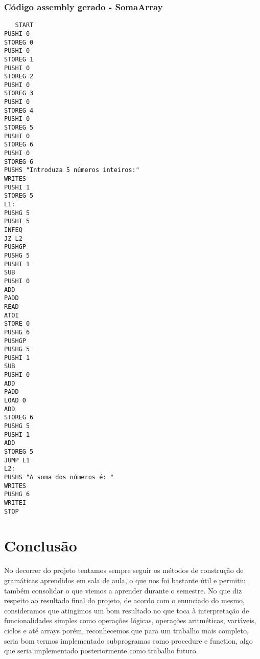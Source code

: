 \documentclass[12pt,a4paper]{report}%
\begin{document}
\subsection{Código assembly gerado - SomaArray }
\begin{verbatim}
   START
PUSHI 0
STOREG 0
PUSHI 0
STOREG 1
PUSHI 0
STOREG 2
PUSHI 0
STOREG 3
PUSHI 0
STOREG 4
PUSHI 0
STOREG 5
PUSHI 0
STOREG 6
PUSHI 0
STOREG 6
PUSHS "Introduza 5 números inteiros:"
WRITES
PUSHI 1
STOREG 5
L1:
PUSHG 5
PUSHI 5
INFEQ
JZ L2
PUSHGP
PUSHG 5
PUSHI 1
SUB
PUSHI 0
ADD
PADD
READ
ATOI
STORE 0
PUSHG 6
PUSHGP
PUSHG 5
PUSHI 1
SUB
PUSHI 0
ADD
PADD
LOAD 0
ADD
STOREG 6
PUSHG 5
PUSHI 1
ADD
STOREG 5
JUMP L1
L2:
PUSHS "A soma dos números é: "
WRITES
PUSHG 6
WRITEI
STOP
\end{verbatim}




\chapter{Conclusão} \label{concl}
No decorrer do projeto tentamos sempre seguir os métodos de construção de gramáticas aprendidos em sala de aula, o que nos foi bastante útil e permitiu também consolidar o que viemos a aprender durante o semestre. No que diz respeito ao resultado final do projeto, de acordo com o enunciado do mesmo, consideramos que atingimos um bom resultado no que toca à interpretação de funcionalidades simples como operações lógicas, operações aritméticas, variáveis, ciclos e até arrays porém, reconhecemos que para um trabalho mais completo, seria bom termos implementado subprogramas como procedure e function, algo que seria implementado posteriormente como trabalho futuro.


\appendix %
\end{document}
